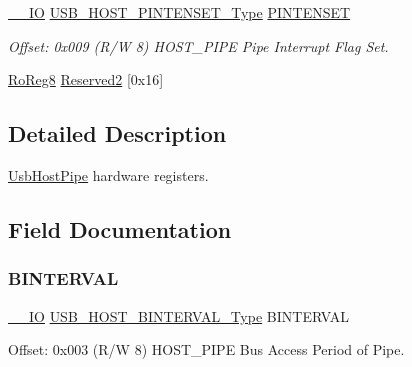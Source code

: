 \begin{DoxyCompactItemize}
\mbox{\hyperlink{core__cm0plus_8h_aec43007d9998a0a0e01faede4133d6be}{\+\_\+\+\_\+\+IO}} \mbox{\hyperlink{union_u_s_b___h_o_s_t___p_i_n_t_e_n_s_e_t___type}{U\+S\+B\+\_\+\+H\+O\+S\+T\+\_\+\+P\+I\+N\+T\+E\+N\+S\+E\+T\+\_\+\+Type}} \mbox{\hyperlink{struct_usb_host_pipe_a638d95168501256cd970460f5bd370e7}{P\+I\+N\+T\+E\+N\+S\+ET}}
\begin{DoxyCompactList}\small\item\em Offset\+: 0x009 (R/W 8) H\+O\+S\+T\+\_\+\+P\+I\+PE Pipe Interrupt Flag Set. \end{DoxyCompactList}\item 
\mbox{\hyperlink{group___s_a_m_d21_e15_a__definitions_ga0d957f1433aaf5d70e4dc2b68288442d}{Ro\+Reg8}} \mbox{\hyperlink{struct_usb_host_pipe_ae1a87a5a7a573aef81319e37b8a8e3d3}{Reserved2}} \mbox{[}0x16\mbox{]}
\end{DoxyCompactItemize}


\subsection{Detailed Description}
\mbox{\hyperlink{struct_usb_host_pipe}{Usb\+Host\+Pipe}} hardware registers. 

\subsection{Field Documentation}
\mbox{\label{struct_usb_host_pipe_a921cde8e177ca6129f638373f8e8e8b5}} 
\subsubsection{\texorpdfstring{BINTERVAL}{BINTERVAL}}
{\footnotesize\ttfamily \mbox{\hyperlink{core__cm0plus_8h_aec43007d9998a0a0e01faede4133d6be}{\+\_\+\+\_\+\+IO}} \mbox{\hyperlink{union_u_s_b___h_o_s_t___b_i_n_t_e_r_v_a_l___type}{U\+S\+B\+\_\+\+H\+O\+S\+T\+\_\+\+B\+I\+N\+T\+E\+R\+V\+A\+L\+\_\+\+Type}} B\+I\+N\+T\+E\+R\+V\+AL}



Offset\+: 0x003 (R/W 8) H\+O\+S\+T\+\_\+\+P\+I\+PE Bus Access Period of Pipe. 

\mbox{\label{struct_usb_host_pipe_aaf9386b2ea951c922e1000a0534027df}} 
